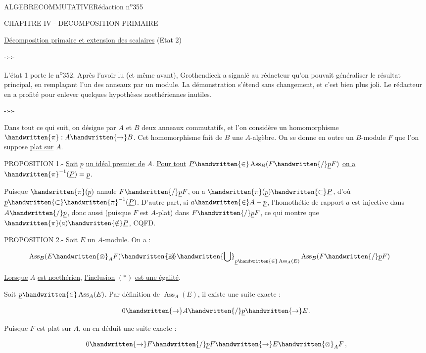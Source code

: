 \noindent\hfill ALGEBRE\quad COMMUTATIVE\hfill Rédaction n\textsuperscript{o}355

CHAPITRE IV - DECOMPOSITION PRIMAIRE

\uline{Décomposition primaire et extension des scalaires} (Etat 2)

\begin{center}-:-:-\end{center}

L'état 1 porte le n\textsuperscript{o}352. Après l'avoir lu (et même avant), Grothendieck a signalé au rédacteur qu'on pouvait généraliser le résultat principal, en remplaçant l'un des anneaux par un module. La démonstration s'étend sans changement, et c'est bien plus joli. Le rédacteur en a profité pour enlever quelques hypothèses noethériennes inutiles.

\begin{center}-:-:-\end{center}

Dans tout ce qui suit, on désigne par $A$ et $B$ deux anneaux commutatifs, et l'on considère un homomorphisme $\handwritten{\pi}:A\handwritten{\to} B$. Cet homomorphisme fait de $B$ une $A$-algèbre. On se donne en outre un $B$-module $F$ que l'on suppose \uline{plat sur} $A$.

PROPOSITION 1.- \uline{Soit} $\underline p$ \uline{un idéal premier de} $A$. \uline{Pour tout} $\underline P\handwritten{\in}\operatorname{Ass}_B(F\handwritten{/}\underline p F)$ \uline{on a} $\handwritten{\pi}^{-1}(\underline P)=\underline p$.

Puisque $\handwritten{\pi}(\underline p)$ annule $F\handwritten{/}\underline p F$, on a $\handwritten{\pi}(\underline p)\handwritten{\subset}\underline P$, d'où $\underline p\handwritten{\subset}\handwritten{\pi}^{-1}(\underline P)$. D'autre part, si $a\handwritten{\in} A-\underline p$, l'homothétie de rapport $a$ est injective dans $A\handwritten{/}\underline p$, donc aussi (puisque $F$ est $A$-plat) dans $F\handwritten{/}\underline p F$, ce qui montre que $\handwritten{\pi}(a)\handwritten{\notin}\underline P$, CQFD.

PROPOSITION 2.- \uline{Soit} $E$ \uline{un} $A$-\uline{module}. \uline{On a} :

\[
\operatorname{Ass}_B(E\handwritten{\otimes}_A F)\handwritten{\supset}\handwritten{\bigcup}_{\underline p\handwritten{\in}\operatorname{Ass}_A(E)}\operatorname{Ass}_B(F\handwritten{/}\underline p F)
\tag*{\makebox[0pt][r]{\makebox[\linewidth][l]{$(\ast)$}}}
\]

\uline{Lorsque} $A$ \uline{est noethérien}, \uline{l'inclusion} $(\ast)$ \uline{est une égalité}.

Soit $\underline p\handwritten{\in}\operatorname{Ass}_A(E)$. Par définition de $\operatorname{Ass}_A(E)$, il existe une suite exacte :

\[
0\handwritten{\to} A\handwritten{/}\underline p\handwritten{\to} E\,.
\]

Puisque $F$ est plat sur $A$, on en déduit une suite exacte :

\[
0\handwritten{\to} F\handwritten{/}\underline p F\handwritten{\to} E\handwritten{\otimes}_A F\,,
\]

